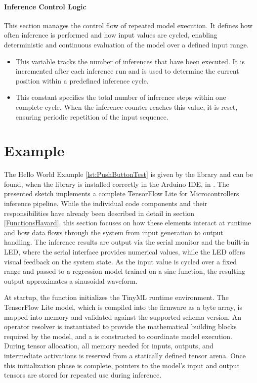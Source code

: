 \paragraph{Inference Control Logic}

This section manages the control flow of repeated model execution. It defines how often inference is performed and how input values are cycled, enabling deterministic and continuous evaluation of the model over a defined input range.

\begin{itemize}
	\item {} 
	
	This variable tracks the number of inferences that have been executed. It is incremented after each inference run and is used to determine the current position within a predefined inference cycle.

	\item {} 
	
	This constant specifies the total number of inference steps within one complete cycle. When the inference counter reaches this value, it is reset, ensuring periodic repetition of the input sequence.
\end{itemize}



\section{Example}

The Hello World Example \ref{lst:PushButtonTest} is given by the library and can be found, when the library is installed correctly in the Arduino IDE, in . The presented sketch implements a complete TensorFlow Lite for Microcontrollers inference pipeline. While the individual code components and their responsibilities have already been described in detail in section \ref{FunctionsHavard}, this section focuses on how these elements interact at runtime and how data flows through the system from input generation to output handling. The inference results are output via the serial monitor and the built-in LED, where the serial interface provides numerical values, while the LED offers visual feedback on the system state. As the input value is cycled over a fixed range and passed to a regression model trained on a sine function, the resulting output approximates a sinusoidal waveform.

At startup, the  function initializes the TinyML runtime environment. The TensorFlow Lite model, which is compiled into the firmware as a byte array, is mapped into memory and validated against the supported schema version. An operator resolver is instantiated to provide the mathematical building blocks required by the model, and a  is constructed to coordinate model execution. During tensor allocation, all memory needed for inputs, outputs, and intermediate activations is reserved from a statically defined tensor arena. Once this initialization phase is complete, pointers to the model’s input and output tensors are stored for repeated use during inference.

